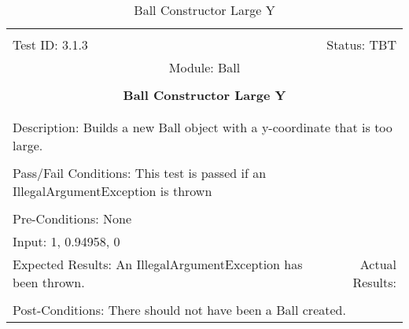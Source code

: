 \documentclass[titlepage]{article}
\begin{document}
\begin{center}%
\begin{table}
\begin{tabular}{|l r|}\hline&\\[-2mm]
	Test ID: 3.1.3	&Status: TBT\\[-3mm]
	\multicolumn{2}{|c|}{Module: Ball}\\&\\
	\multicolumn{2}{|c|}{\textbf{\large{Ball Constructor Large Y}}}\\&\\\hline&\\[-3mm]
	\multicolumn{2}{|p{\textwidth}|}{Description: Builds a new Ball object with a y-coordinate that is too large.}\\[1mm]\hline&\\[-3mm]
	\multicolumn{2}{|p{\textwidth}|}{Pass/Fail Conditions: This test is passed if an IllegalArgumentException is thrown}\\[1mm]\hline&\\[-3mm]
	\multicolumn{2}{|p{\textwidth}|}{Pre-Conditions: None}\\[4mm]
	\multicolumn{2}{|p{\textwidth}|}{Input: 1, 0.94958, 0}\\[2mm]\hline
	\multicolumn{1}{|p{0.49\textwidth}}{Expected Results: An IllegalArgumentException has been thrown.}	&\multicolumn{1}{|p{0.45\textwidth}|}{Actual Results:}\\\hline&\\[-3mm]
	\multicolumn{2}{|p{\textwidth}|}{Post-Conditions: There should not have been a Ball created.}\\\hline
\end{tabular}
\caption{Ball Constructor Large Y}
\end{table}
\end{center}
\end{document}
